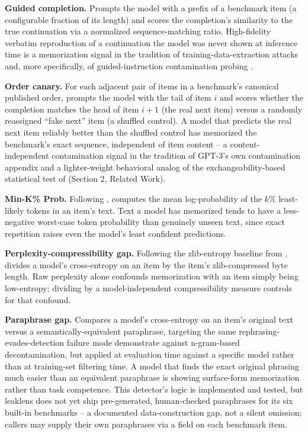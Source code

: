 \documentclass[11pt]{article}
\begin{document}
\textbf{Guided completion.} Prompts the model with a prefix of a
benchmark item (a configurable fraction of its length) and scores the
completion's similarity to the true continuation via a normalized
sequence-matching ratio. High-fidelity verbatim reproduction of a
continuation the model was never shown at inference time is a
memorization signal in the tradition of training-data-extraction attacks
\citep{carlini2021extracting} and, more specifically, of guided-instruction
contamination probing \citep{golchin2023timetravel}.

\textbf{Order canary.} For each adjacent pair of items in a benchmark's
canonical published order, prompts the model with the tail of item $i$
and scores whether the completion matches the head of item $i{+}1$ (the
real next item) versus a randomly reassigned ``fake next'' item (a
shuffled control). A model that predicts the real next item reliably
better than the shuffled control has memorized the benchmark's exact
sequence, independent of item content -- a content-independent
contamination signal in the tradition of GPT-3's own contamination
appendix \citep{brown2020language} and a lighter-weight behavioral analog
of the exchangeability-based statistical test of \citet{oren2023proving}
(Section 2, Related Work).

\textbf{Min-K\% Prob.} Following \citet{shi2023detecting}, computes the
mean log-probability of the $k$\% least-likely tokens in an item's text.
Text a model has memorized tends to have a less-negative worst-case
token probability than genuinely unseen text, since exact repetition
raises even the model's least confident predictions.

\textbf{Perplexity-compressibility gap.} Following the zlib-entropy
baseline from \citet{carlini2021extracting}, divides a model's
cross-entropy on an item by the item's zlib-compressed byte length. Raw
perplexity alone confounds memorization with an item simply being
low-entropy; dividing by a model-independent compressibility measure
controls for that confound.

\textbf{Paraphrase gap.} Compares a model's cross-entropy on an item's
original text versus a semantically-equivalent paraphrase, targeting the
same rephrasing-evades-detection failure mode \citet{yang2023rethinking}
demonstrate against n-gram-based decontamination, but applied at
evaluation time against a specific model rather than at training-set
filtering time. A model that finds the exact original phrasing much
easier than an equivalent paraphrase is showing surface-form memorization
rather than task competence. This detector's logic is implemented and
tested, but
leaklens does not yet ship pre-generated, human-checked paraphrases for
its six built-in benchmarks -- a documented data-construction gap, not a
silent omission; callers may supply their own paraphrases via a field on
each benchmark item.
\end{document}
